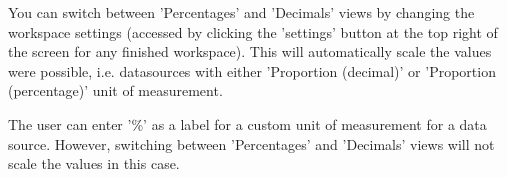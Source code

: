 \documentclass[00_mcda_tutorial.tex]{subfiles}
\begin{document}
\noindent You can switch between 'Percentages' and 'Decimals' views by changing the workspace settings (accessed by clicking the 'settings' button at the top right of the screen for any finished workspace). This will automatically scale the values were possible, i.e. datasources with either 'Proportion (decimal)' or 'Proportion (percentage)' unit of measurement.
\newline

\noindent The user can enter '\%' as a label for a custom unit of measurement  for a data source. However, switching between 'Percentages' and 'Decimals' views will not scale the values in this case.
\end{document}
